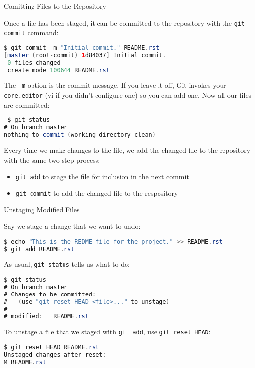 \documentclass{beamer}
\begin{document}
\begin{frame}[fragile]{Comitting Files to the Repository}


Once a file has been staged, it can be committed to the repository with the {\tt git commit} command:

\begin{lstlisting}[language=Java]
$ git commit -m "Initial commit." README.rst
[master (root-commit) 1d84037] Initial commit.
 0 files changed
 create mode 100644 README.rst
\end{lstlisting}

The {\tt -m} option is the commit message. If you leave it off, Git invokes your {\tt core.editor} (vi if you didn't configure one) so you can add one. Now all our files are committed:

\begin{lstlisting}[language=Java]
￼$ git status
# On branch master
nothing to commit (working directory clean)
\end{lstlisting}

Every time we make changes to the file, we add the changed file to the repository with the same two step process:

\begin{itemize}
\item {\tt git add} to stage the file for inclusion in the next commit
\item {\tt git commit} to add the changed file to the respository
\end{itemize}


\end{frame}

\begin{frame}[fragile]{Unstaging Modified Files}


Say we stage a change that we want to undo:

\begin{lstlisting}[language=Java]
$ echo "This is the REDME file for the project." >> README.rst
$ git add README.rst
\end{lstlisting}

As usual, {\tt git status} tells us what to do:

\begin{lstlisting}[language=Java]
$ git status
# On branch master
# Changes to be committed:
#   (use "git reset HEAD <file>..." to unstage)
#
# modified:   README.rst
\end{lstlisting}

To unstage a file that we staged with {\tt git add}, use {\tt git reset HEAD}:
\begin{lstlisting}[language=Java]
$ git reset HEAD README.rst
Unstaged changes after reset:
M README.rst
\end{lstlisting}


\end{frame}
\end{document}
